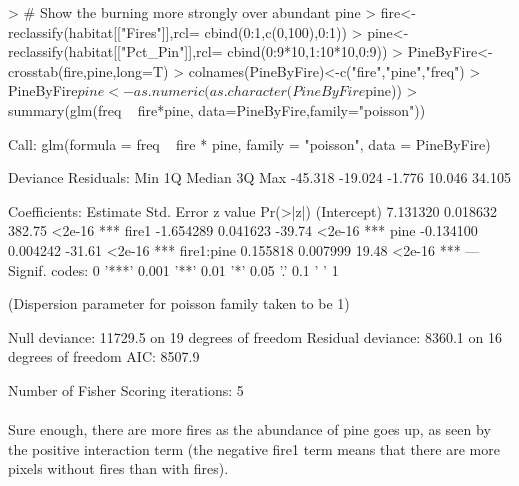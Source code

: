 \documentclass{article}
\begin{document}
\begin{Schunk}
\begin{Sinput}
> # Show the burning more strongly over abundant pine
> fire<-reclassify(habitat[["Fires"]],rcl= cbind(0:1,c(0,100),0:1))
> pine<-reclassify(habitat[["Pct_Pin"]],rcl= cbind(0:9*10,1:10*10,0:9))
> PineByFire<-crosstab(fire,pine,long=T)
> colnames(PineByFire)<-c("fire","pine","freq")
> PineByFire$pine <- as.numeric(as.character(PineByFire$pine))
> summary(glm(freq ~ fire*pine, data=PineByFire,family="poisson"))
\end{Sinput}
\begin{Soutput}
Call:
glm(formula = freq ~ fire * pine, family = "poisson", data = PineByFire)

Deviance Residuals: 
    Min       1Q   Median       3Q      Max  
-45.318  -19.024   -1.776   10.046   34.105  

Coefficients:
             Estimate Std. Error z value Pr(>|z|)    
(Intercept)  7.131320   0.018632  382.75   <2e-16 ***
fire1       -1.654289   0.041623  -39.74   <2e-16 ***
pine        -0.134100   0.004242  -31.61   <2e-16 ***
fire1:pine   0.155818   0.007999   19.48   <2e-16 ***
---
Signif. codes:  0 '***' 0.001 '**' 0.01 '*' 0.05 '.' 0.1 ' ' 1

(Dispersion parameter for poisson family taken to be 1)

    Null deviance: 11729.5  on 19  degrees of freedom
Residual deviance:  8360.1  on 16  degrees of freedom
AIC: 8507.9

Number of Fisher Scoring iterations: 5
\end{Soutput}
\end{Schunk}

\paragraph{}
Sure enough, there are more fires as the abundance of pine goes up, as seen by the positive interaction term (the negative fire1 term means that there are more pixels without fires than with fires).
\end{document}
